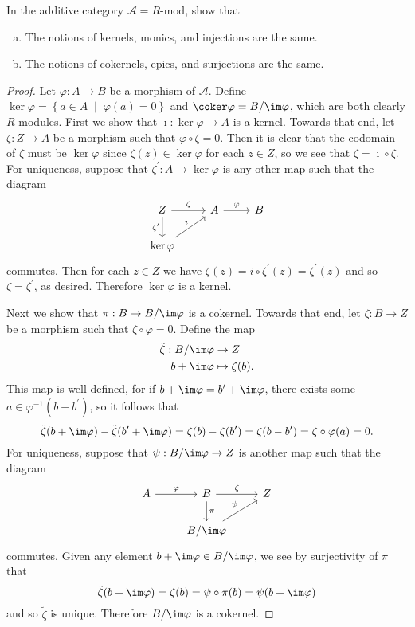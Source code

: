 \documentclass[10pt]{amsart}
\begin{document}
\begin{ex}\label{Ex1}
  In the additive category $\mathcal{A} = R\text{-mod}$, show that
  \begin{enumerate}[(a)]
  \item
    The notions of kernels, monics, and injections are the same.
  \item
    The notions of cokernels, epics, and surjections are the same.
  \end{enumerate}
  \begin{proof}
    Let $\varphi : A \rightarrow B$ be a morphism of $\mathcal{A}$.
    Define $\ker\varphi = \left\{ a \in A \;\middle\vert\; \varphi(a) = 0\right\}$ and $\coker\varphi = B/\im\varphi$, which are both clearly $R$-modules.
    First we show that $\imath : \ker\varphi \rightarrow A$ is a kernel.
    Towards that end, let $\zeta : Z \rightarrow A$ be a morphism such that $\varphi \circ \zeta = 0$.
    Then it is clear that the codomain of $\zeta$ must be $\ker\varphi$ since $\zeta(z) \in \ker\varphi$ for each $z \in Z$, so we see that $\zeta = \imath \circ \zeta$.
    For uniqueness, suppose that $\zeta^\prime : A \rightarrow \ker\varphi$ is any other map such that the diagram
    $$\begin{tikzcd}
      Z \arrow[swap]{d}{\zeta^\prime} \arrow{r}{\zeta} &A \arrow{r}{\varphi} &B \\
      \ker\varphi\arrow{ru}{\imath}
    \end{tikzcd}$$
    commutes.
    Then for each $z \in Z$ we have $\zeta(z) = i \circ \zeta^\prime(z) = \zeta^\prime(z)$ and so $\zeta = \zeta^\prime$, as desired.
    Therefore $\ker\varphi$ is a kernel.

    Next we show that $\pi : B \rightarrow B/\im\varphi$ is a cokernel.
    Towards that end, let $\zeta : B \rightarrow Z$ be a morphism such that $\zeta \circ \varphi = 0$.
    Define the map
    \begin{align*}
      \tilde{\zeta} : B/\im\varphi &\rightarrow Z\\
      b + \im\varphi &\mapsto \zeta(b).
    \end{align*}
    This map is well defined, for if $b + \im\varphi = b^\prime + \im\varphi$, there exists some $a \in \varphi^{-1}(b - b^\prime)$, so it follows that
    $$\tilde{\zeta}(b + \im\varphi) - \tilde{\zeta}(b^\prime + \im\varphi) = \zeta(b) - \zeta(b^\prime) = \zeta(b - b^\prime) = \zeta \circ \varphi(a) = 0.$$
    For uniqueness, suppose that $\psi : B/\im\varphi \rightarrow Z$ is another map such that the diagram
    $$\begin{tikzcd}
      A \arrow{r}{\varphi} & B \arrow{d}{\pi} \arrow{r}{\zeta} & Z\\
      & B/\im\varphi \arrow{ur}{\psi}
    \end{tikzcd}$$
    commutes.
    Given any element $b + \im\varphi \in B/\im\varphi$, we see by surjectivity of $\pi$ that
    $$\tilde{\zeta}(b + \im\varphi) = \zeta(b) = \psi \circ \pi(b) = \psi(b + \im\varphi)$$
    and so $\tilde{\zeta}$ is unique.
    Therefore $B/\im\varphi$ is a cokernel.
    

\end{proof}
\end{ex}
\end{document}
